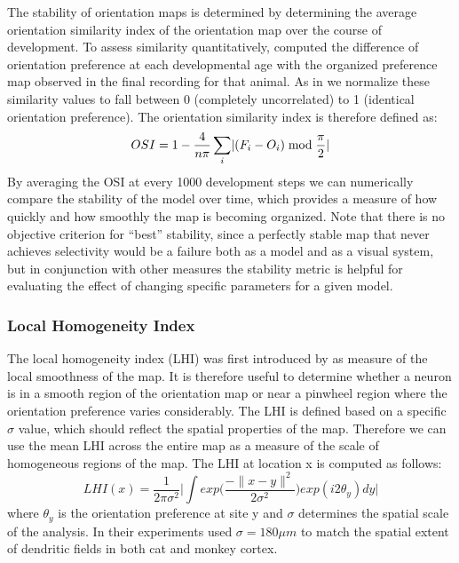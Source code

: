 The stability of orientation maps is determined by determining the
average orientation similarity index of the orientation map over the
course of development. To assess similarity quantitatively,
\cite{Chapman1996} computed the difference of orientation preference
at each developmental age with the organized preference map observed
in the final recording for that animal. As in \cite{Stevens2013} we
normalize these similarity values to fall between 0 (completely
uncorrelated) to 1 (identical orientation preference). The orientation
similarity index is therefore defined as:
\begin{equation}
  OSI = 1 - \frac{4}{n\pi} \sum_{i}\lvert(F_{i}-O_{i})\bmod\frac{\pi}{2}\rvert
\end{equation}
By averaging the OSI at every 1000 development steps we can
numerically compare the stability of the model over time, which
provides a measure of how quickly and how smoothly the map is becoming
organized. Note that there is no objective criterion for ``best''
stability, since a perfectly stable map that never achieves
selectivity would be a failure both as a model and as a visual system,
but in conjunction with other measures the stability metric is helpful
for evaluating the effect of changing specific parameters for a given
model.

\subsubsection{Local Homogeneity Index}

The local homogeneity index (LHI) was first introduced by
\cite{Nauhaus2008} as measure of the local smoothness of the map. It
is therefore useful to determine whether a neuron is in a smooth
region of the orientation map or near a pinwheel region where the
orientation preference varies considerably. The LHI is defined based
on a specific $\sigma$ value, which should reflect the spatial
properties of the map. Therefore we can use the mean LHI across the
entire map as a measure of the scale of homogeneous regions of the
map. The LHI at location x is computed as follows:
\begin{equation}
  LHI(x) = \frac{1}{2\pi \sigma^2} \bigg\lvert \int
  exp\bigg(\frac{-\|x-y\|^2}{2\sigma^2}\bigg) exp(i2\theta_y) dy
  \bigg\rvert
\end{equation}
where $\theta_y$ is the orientation preference at site y and $\sigma$
determines the spatial scale of the analysis. In their experiments
\cite{Nauhaus2008} used $\sigma=180\mu m$ to match the spatial extent
of dendritic fields in both cat and monkey cortex.


